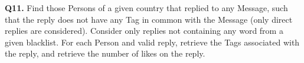 \textbf{Q11.}
Find those Persons of a given country that replied to any Message, such
that the reply does not have any Tag in common with the Message (only
direct replies are considered). Consider only
replies not containing any word from a given blacklist. For each
Person and valid reply, retrieve the Tags associated with the reply, and
retrieve the number of likes on the reply.

